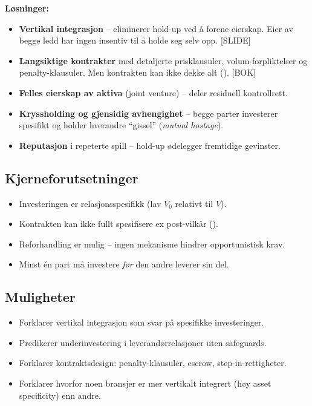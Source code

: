 \textbf{Løsninger:}
\begin{itemize}\setlength{\itemsep}{2pt}
\item \textbf{Vertikal integrasjon} -- eliminerer hold-up ved å forene eierskap. Eier av begge ledd har ingen insentiv til å holde seg selv opp. [SLIDE]
\item \textbf{Langsiktige kontrakter} med detaljerte prisklausuler, volum-forpliktelser og penalty-klausuler. Men kontrakten kan ikke dekke alt (). [BOK]
\item \textbf{Felles eierskap av aktiva} (joint venture) -- deler residuell kontrollrett.
\item \textbf{Kryssholding og gjensidig avhengighet} -- begge parter investerer spesifikt og holder hverandre ``gissel'' (\emph{mutual hostage}).
\item \textbf{Reputasjon} i repeterte spill -- hold-up ødelegger fremtidige gevinster.
\end{itemize}

\subsection*{Kjerneforutsetninger}
\begin{itemize}
\item Investeringen er relasjonsspesifikk (lav $V_0$ relativt til $V$).
\item Kontrakten kan ikke fullt spesifisere ex post-vilkår ().
\item Reforhandling er mulig -- ingen mekanisme hindrer opportunistisk krav.
\item Minst én part må investere \emph{før} den andre leverer sin del.
\end{itemize}

\subsection*{Muligheter}
\begin{itemize}
\item Forklarer vertikal integrasjon som svar på spesifikke investeringer.
\item Predikerer underinvestering i leverandørrelasjoner uten safeguards.
\item Forklarer kontraktsdesign: penalty-klausuler, escrow, step-in-rettigheter.
\item Forklarer hvorfor noen bransjer er mer vertikalt integrert (høy asset specificity) enn andre.
\end{itemize}

